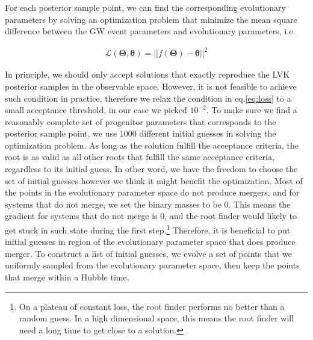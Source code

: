 \documentclass[twocolumn]{aastex631}
\newcommand{\kw}[1]{{\color{rb4}[KW: #1 ]}}
\begin{document}
For each posterior sample point, we can find the corresponding evolutionary parameters by solving an optimization problem that minimize the mean square difference between the GW event parameters and evolutionary parameters, i.e. 

\begin{align}
\mathcal{L}(\bm{\Theta},\bm{\theta}) = ||f(\bm{\Theta})-\bm{\theta}||^2
\label{eq:loss}
\end{align}

In principle, we should only accept solutions that exactly reproduce the LVK posterior samples in the observable space.
However, it is not feasible to achieve such condition in practice, therefore we relax the condition in eq.\ref{eq:loss} to a small acceptance threshold, in our case we picked $10^{-2}$.
To make sure we find a reasonably complete set of progenitor parameters that corresponds to the posterior sample point, we use 1000 different initial guesses in solving the optimization problem.
As long as the solution fulfill the acceptance criteria, the root is as valid as all other roots that fulfill the same acceptance criteria, regardless to its initial guess.
In other word, we have the freedom to choose the set of initial guesses however we think it might benefit the optimization.
Most of the points in the evolutionary parameter space do not produce mergers, and for systems that do not merge, we set the binary masses to be 0.
This means the gradient for systems that do not merge is 0, and the root finder would likely to get stuck in such state during the first step.\footnote{On a plateau of constant loss, the root finder performs no better than a random guess. In a high dimensional space, this means the root finder will need a long time to get close to a solution.}
Therefore, it is beneficial to put initial guesses in region of the evolutionary parameter space that does produce merger.
To construct a list of initial guesses, we evolve a set of points that we uniformly sampled from the evolutionary parameter space, then keep the points that merge within a Hubble time.
\end{document}
